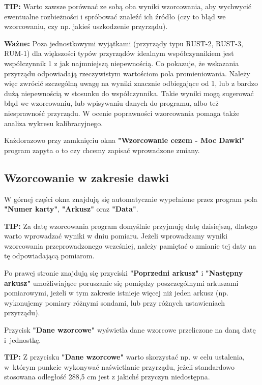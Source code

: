 \textbf{TIP:} Warto zawsze porównać ze sobą oba wyniki wzorcowania, aby wychwycić ewentualne rozbieżności i spróbować znaleźć ich źródło (czy to błąd we wzorcowaniu, czy np. jakieś uszkodzenie przyrządu).

\textbf{Ważne:} Poza jednostkowymi wyjątkami (przyrządy typu RUST-2, RUST-3, RUM-1) dla większości typów przyrządów idealnym współczynnikiem jest współczynnik 1 z jak najmniejszą niepewnością. Co pokazuje, że wskazania przyrządu odpowiadają rzeczywistym wartościom pola promieniowania. Należy więc zwrócić szczególną uwagę na wyniki znacznie odbiegające od 1, lub z bardzo dużą niepewnością w stosunku do współczynnika. Takie wyniki mogą sugerować błąd we wzorcowaniu, lub wpisywaniu danych do programu, albo też niesprawność przyrządu. W ocenie poprawności wzorcowania pomaga także analiza wykresu kalibracyjnego.

Każdorazowo przy zamknięciu okna \textbf{"Wzorcowanie cezem - Moc Dawki"} program zapyta o to czy chcemy zapisać wprowadzone zmiany.

\subsection{Wzorcowanie w zakresie dawki}
\label{wzorcowanie_dawka}

W górnej części okna znajdują się automatycznie wypełnione przez program pola \textbf{"Numer karty"}, \textbf{"Arkusz"} oraz \textbf{"Data"}. 

\textbf{TIP:} Za datę wzorcowania program domyślnie przyjmuję datę dzisiejszą, dlatego warto wprowadzać wyniki w dniu pomiaru. Jeżeli wprowadzamy wyniki wzorcowania przeprowadzonego wcześniej, należy pamiętać o zmianie tej daty na tę odpowiadającą pomiarom.

Po prawej stronie znajdują się przyciski \textbf{"Poprzedni arkusz"} i \textbf{"Następny arkusz"} umożliwiające poruszanie się pomiędzy poszczególnymi arkuszami pomiarowymi, jeżeli w tym zakresie istnieje więcej niż jeden arkusz (np. wykonujemy pomiary różnymi sondami, lub przy różnych ustawieniach przyrządu).

Przycisk \textbf{"Dane wzorcowe"} wyświetla dane wzorcowe przeliczone na daną datę i~jednostkę.

\textbf{TIP:} Z przycisku \textbf{"Dane wzorcowe"} warto skorzystać np. w celu ustalenia, w~którym punkcie wykonywać naświetlanie przyrządu, jeżeli standardowo stosowana odległość 288,5 cm jest z jakichś przyczyn niedostępna.


